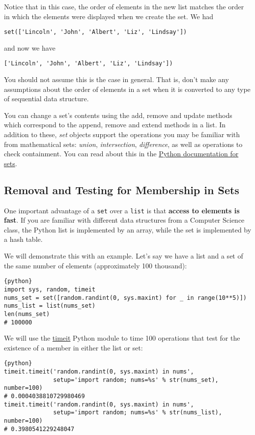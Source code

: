 Notice that in this case, the order of elements in the new list
matches the order in which the elements were displayed when we create
the set. We had

\verb|set(['Lincoln', 'John', 'Albert', 'Liz', 'Lindsay'])| 

and now we have 

\verb|['Lincoln', 'John', 'Albert', 'Liz', 'Lindsay'])|

You should not assume this is the case in general. That is, don't make
any assumptions about the order of elements in a set when it is
converted to any type of sequential data structure.

You can change a set's contents using the add, remove and update methods
which correspond to the append, remove and extend methods in a list. In
addition to these, \emph{set} objects support the operations you may be
familiar with from mathematical sets: \emph{union}, \emph{intersection},
\emph{difference}, as well as operations to check containment. You can
read about this in the
\href{https://docs.python.org/2/library/stdtypes.html\#set}{Python
documentation for sets}.

\subsection{Removal and Testing for Membership in
Sets}\label{removal-and-testing-for-membership-in-sets}

One important advantage of a \verb|set| over a \verb|list| is that
\textbf{access to elements is fast}. If you are familiar with different
data structures from a Computer Science class, the Python list is
implemented by an array, while the set is implemented by a hash table.

We will demonstrate this with an example. Let's say we have a list and a
set of the same number of elements (approximately 100 thousand):

\begin{lstlisting}{python}
import sys, random, timeit
nums_set = set([random.randint(0, sys.maxint) for _ in range(10**5)])
nums_list = list(nums_set)
len(nums_set)
# 100000
\end{lstlisting}

We will use the
\href{https://docs.python.org/2/library/timeit.html}{timeit} Python
module to time 100 operations that test for the existence of a member in
either the list or set:

\begin{lstlisting}{python}
timeit.timeit('random.randint(0, sys.maxint) in nums', 
              setup='import random; nums=%s' % str(nums_set), number=100)
# 0.0004038810729980469
timeit.timeit('random.randint(0, sys.maxint) in nums', 
              setup='import random; nums=%s' % str(nums_list), number=100)
# 0.3980541229248047
\end{lstlisting}

